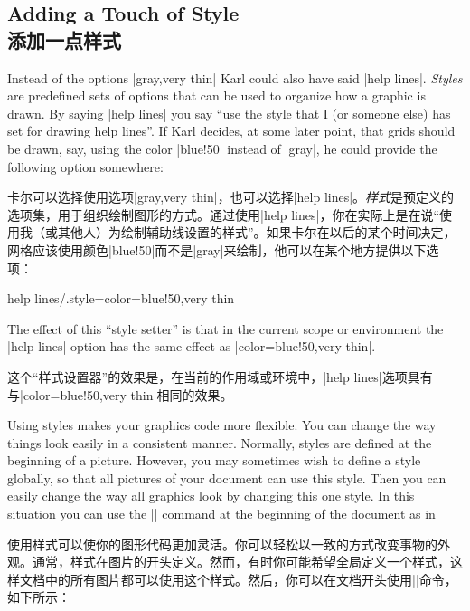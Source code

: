 

\subsection{Adding a Touch of  Style\\添加一点样式}

Instead of the options |gray,very thin| Karl could also have said |help lines|.
\emph{Styles} are predefined sets of options that can be used to organize how a
graphic is drawn. By saying |help lines| you say ``use the style that I (or
someone else) has set for drawing help lines''. If Karl decides, at some later
point, that grids should be drawn, say, using the color |blue!50| instead of
|gray|, he could provide the following option somewhere:
%

卡尔可以选择使用选项|gray,very thin|，也可以选择|help lines|。\emph{样式}是预定义的选项集，用于组织绘制图形的方式。通过使用|help lines|，你在实际上是在说“使用我（或其他人）为绘制辅助线设置的样式”。如果卡尔在以后的某个时间决定，网格应该使用颜色|blue!50|而不是|gray|来绘制，他可以在某个地方提供以下选项：


\begin{codeexample}
help lines/.style={color=blue!50,very thin}
\end{codeexample}
%
The effect of this ``style setter'' is that in the current scope or environment
the |help lines| option has the same effect as |color=blue!50,very thin|.

这个“样式设置器”的效果是，在当前的作用域或环境中，|help lines|选项具有与|color=blue!50,very thin|相同的效果。



Using styles makes your graphics code more flexible. You can change the way
things look easily in a consistent manner. Normally, styles are defined at the
beginning of a picture. However, you may sometimes wish to define a style
globally, so that all pictures of your document can use this style. Then you
can easily change the way all graphics look by changing this one style. In this
situation you can use the |\tikzset| command at the beginning of the document
as in
%

使用样式可以使你的图形代码更加灵活。你可以轻松以一致的方式改变事物的外观。通常，样式在图片的开头定义。然而，有时你可能希望全局定义一个样式，这样文档中的所有图片都可以使用这个样式。然后，你可以在文档开头使用|\tikzset|命令，如下所示：


\begin{codeexample}
\tikzset{help lines/.style=very thin}
\end{codeexample}

